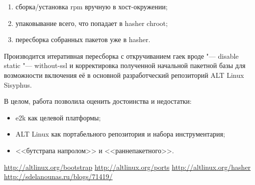 \documentclass[10pt, a5paper]{article}
\begin{document}
\begin{enumerate}
  \item сборка/установка rpm вручную в хост-окружении;
  \item упаковывание всего, что попадает в hasher chroot;
  \item пересборка собранных пакетов уже в hasher.
\end{enumerate}

Производится итеративная пересборка с откручиванием гаек вроде "--- disable static "--- without-ssl и корректировка полученной начальной пакетной базы для возможности включения её в основной разработческий репозиторий ALT Linux Sisyphus.

В целом, работа позволила оценить достоинства и недостатки:

\begin{itemize}
  \item e2k как целевой платформы;
  \item ALT Linux как портабельного репозитория и набора инструментария;
  \item <<бутстрапа напролом>> и <<раннепакетного>>.
\end{itemize}

\begin{thebibliography}{99}
   \url{http://altlinux.org/bootstrap}
   \url{http://altlinux.org/ports}
   \url{http://altlinux.org/hasher}
   \url{http://sdelanounas.ru/blogs/71419/}
\end{thebibliography}
\end{document}
